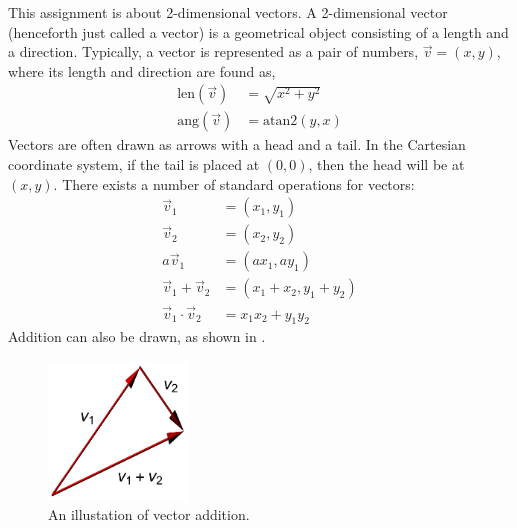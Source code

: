 This assignment is about 2-dimensional vectors. A 2-dimensional vector
(henceforth just called a vector) is a geometrical object consisting
of a length and a direction. Typically, a vector is represented as
a pair of numbers, $\vec v  = (x, y)$, where its length and direction
are found as,
\begin{align}
  \text{len}(\vec v) &= \sqrt{x^2+y^2}
  \\\text{ang}(\vec v) &=\text{atan2}(y, x)
\end{align}
Vectors are often drawn as arrows with a head and a tail. In the
Cartesian coordinate system, if the tail is placed at $(0, 0)$,
then the head will be at $(x, y)$. There exists a number
of standard operations for vectors:
\begin{align}
  \vec v_1 &= (x_1, y_1)
  \\\vec v_2 &= (x_2, y_2)
  \\a \vec v_1 &= (a x_1, a y_1)
  \\\vec v_1 + \vec v_2 &= (x_1+x_2, y_1+y_2)
  \\\vec v_1 \cdot \vec v_2 &= x_1 x_2 +  y_1y_2
\end{align}
Addition can also be drawn, as shown in .
\begin{figure}[h]
  \centering
  \includegraphics[width=0.33\textwidth]{vectorAddition}
  \caption{An illustation of vector addition.}
  \label{fig:vectorAddition}
\end{figure}
